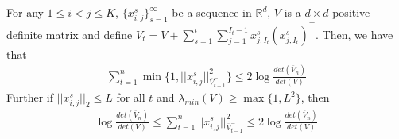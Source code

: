 \begin{lem}
	\label{lem:x_norm}
	For any $1 \le i < j \le K$, $\{x_{i,j}^s\}_{s=1}^\infty$ be a sequence in $\mathbb{R}^d$, $V$ is a $d \times d$ positive definite matrix and define $\overline{V}_t = V + \sum_{s=1}^{t}\sum_{j=1}^{I_t-1}x_{j, I_t}^s(x_{j, I_t}^s)^\top$. Then, we have that 
	\begin{align*}
	\sum_{t=1}^n \min\{1, ||x_{i,j}^s||_{\overline{V}_{t-1}^-}^2\} \le 2\log\frac{det(\overline{V}_n)}{det(V)}
	\end{align*}
	Further if $||x_{i,j}^s||_2 \le L$ for all $t$ and $\lambda_{min}(V) \ge \max\{1, L^2\}$, then
	\begin{align*}
	\log\frac{det(\overline{V}_n)}{det(V)} \le \sum_{t=1}^n ||x_{i,j}^s||_{\overline{V}_{t-1}^-}^2 \le 2\log\frac{det(\overline{V}_n)}{det(V)}
	\end{align*}
\end{lem}


